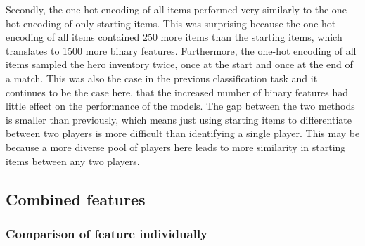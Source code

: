 \documentclass[Report.tex]{subfiles}
\begin{document}
Secondly, the one-hot encoding of all items performed very similarly to the one-hot encoding of only starting items. This was surprising because the one-hot encoding of all items contained 250 more items than the starting items, which translates to 1500 more binary features. Furthermore, the one-hot encoding of all items sampled the hero inventory twice, once at the start and once at the end of a match. This was also the case in the previous classification task and it continues to be the case here, that the increased number of binary features had little effect on the performance of the models. The gap between the two methods is smaller than previously, which means just using starting items to differentiate between two players is more difficult than identifying a single player. This may be because a more diverse pool of players here leads to more similarity in starting items between any two players. 

\subsection{Combined features}

\subsubsection{Comparison of feature individually}
\end{document}

